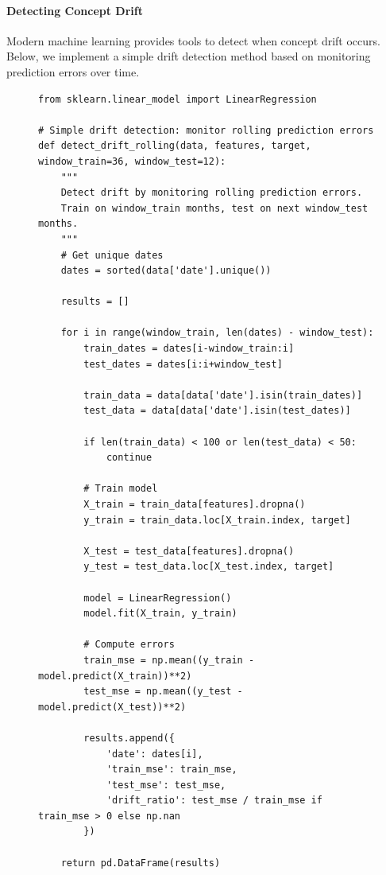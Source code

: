 \paragraph{Detecting Concept Drift}

Modern machine learning provides tools to detect when concept drift occurs. Below, we implement a simple drift detection method based on monitoring prediction errors over time.

\begin{figure}[!htbp]
\centering
\begin{verbatim}
from sklearn.linear_model import LinearRegression

# Simple drift detection: monitor rolling prediction errors
def detect_drift_rolling(data, features, target, window_train=36, window_test=12):
    """
    Detect drift by monitoring rolling prediction errors.
    Train on window_train months, test on next window_test months.
    """
    # Get unique dates
    dates = sorted(data['date'].unique())
    
    results = []
    
    for i in range(window_train, len(dates) - window_test):
        train_dates = dates[i-window_train:i]
        test_dates = dates[i:i+window_test]
        
        train_data = data[data['date'].isin(train_dates)]
        test_data = data[data['date'].isin(test_dates)]
        
        if len(train_data) < 100 or len(test_data) < 50:
            continue
        
        # Train model
        X_train = train_data[features].dropna()
        y_train = train_data.loc[X_train.index, target]
        
        X_test = test_data[features].dropna()
        y_test = test_data.loc[X_test.index, target]
        
        model = LinearRegression()
        model.fit(X_train, y_train)
        
        # Compute errors
        train_mse = np.mean((y_train - model.predict(X_train))**2)
        test_mse = np.mean((y_test - model.predict(X_test))**2)
        
        results.append({
            'date': dates[i],
            'train_mse': train_mse,
            'test_mse': test_mse,
            'drift_ratio': test_mse / train_mse if train_mse > 0 else np.nan
        })
    
    return pd.DataFrame(results)


\end{verbatim}
\end{figure}
